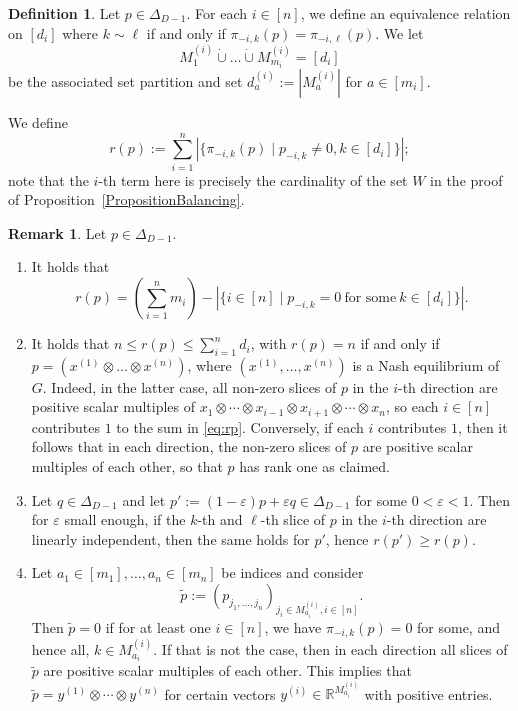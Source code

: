\documentclass[11pt]{amsart}
\theoremstyle{definition}
\newtheorem{remark}[theorem]{Remark}
\newtheorem{definition}[theorem]{Definition}
\numberwithin{subcase}{case}
\renewcommand{\tilde}[1]{\widetilde{#1}}
\newcommand{\RR}{{\mathbb R}}
\begin{document}
\begin{definition} \label{de:Partition}
Let $p \in \Delta_{D-1}$. For each $i \in [n]$, we define an
equivalence relation on $[d_i]$ where $k \sim \ell$ if and only if
$\pi_{-i,k}(p)=\pi_{-i,\ell}(p)$. We let \[M^{(i)}_1 \dot{\cup}
\dots \dot{\cup} M^{(i)}_{m_i} = [d_i]\] be the associated set
partition and set $d^{(i)}_a:=|M^{(i)}_a|$ for $a \in [m_i]$.



\noindent We define 
\begin{equation} \label{eq:rp} r(p):=\sum_{i=1}^n |\{ \pi_{-i,k}(p)
\mid p_{-i,k} \neq 0, k \in [d_i]   \}|; \end{equation}
note that the $i$-th term here is precisely the cardinality of the set
$W$ in the proof of Proposition~\ref{PropositionBalancing}.
\end{definition}
\begin{remark}
\label{RemarkR}
Let $p \in \Delta_{D-1}$.
\begin{enumerate}
    \item It holds that \[r(p) = \left( \sum_{i=1}^n m_i \right) - |\{i \in [n] \mid p_{-i,k}=0 \ \text{for some} \ k \in [d_i]   \}  |.  \]
    \item It holds that $n \leq r(p) \leq \sum_{i=1}^n d_i$, with
    $r(p)=n$ if and only if $p=(x^{(1)} \otimes \dots \otimes
    x^{(n)})$, where $(x^{(1)}, \dots, x^{(n)})$ is a Nash equilibrium
    of $G$. Indeed, in the latter case, all non-zero slices of $p$ in
    the $i$-th direction are positive scalar multiples of $x_1 \otimes
    \cdots \otimes x_{i-1} \otimes x_{i+1} \otimes \cdots \otimes x_n$, so each $i \in [n]$
    contributes $1$ to the sum in \eqref{eq:rp}. Conversely, if each $i$
    contributes $1$, then it follows that in each direction, the
    non-zero slices of $p$ are positive scalar multiples of each other,
    so that $p$ has rank one as claimed. 
    \item Let $q \in \Delta_{D-1}$ and let $p':=(1- \varepsilon)p +
    \varepsilon q \in \Delta_{D-1}$ for some $0< \varepsilon <1$.
    Then for $\varepsilon$ small enough, if the $k$-th and $\ell$-th
    slice of $p$ in the $i$-th direction are linearly independent, then 
    the same holds for $p'$, hence $r(p') \geq r(p)$. 
    \item Let $a_1 \in [m_1], \dots, a_n \in [m_n]$ be indices and
    consider \[ \tilde{p}:=(p_{j_1, \dots, j_n})_{j_i \in
    M^{(i)}_{a_i}, i \in [n]}.\] Then $\tilde{p}=0$ if 
    for at least one $i \in [n]$, we have $\pi_{-i,k}(p)=0$ for some,
    and hence all, $k \in M_{a_i}^{(i)}$. If that is not the case,
    then in each direction all slices of $\tilde{p}$ 
    are positive scalar multiples of each other. This implies
    that $\tilde{p}=y^{(1)} \otimes \cdots \otimes y^{(n)}$ for
    certain vectors $y^{(i)} \in \RR^{M^{(i)}_{a_i}}$ with 
    positive entries. 
\end{enumerate}
\end{remark}
\end{document}
